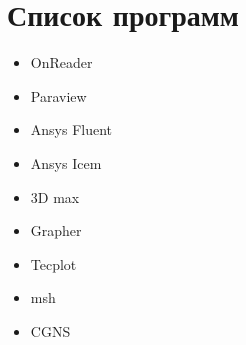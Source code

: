 \documentclass[a4paper,12pt]{article}
\begin{document}
\section{Список программ}

\begin{itemize}
\item OnReader
\item Paraview
\item Ansys Fluent
\item Ansys Icem
\item 3D max
\item Grapher
\item Tecplot
\item msh
\item CGNS
\end{itemize}
\end{document}
